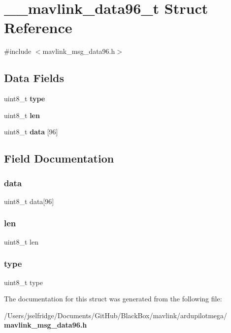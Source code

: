 \section{\+\_\+\+\_\+mavlink\+\_\+data96\+\_\+t Struct Reference}
\label{struct____mavlink__data96__t}


{\ttfamily \#include $<$mavlink\+\_\+msg\+\_\+data96.\+h$>$}

\subsection*{Data Fields}
\begin{DoxyCompactItemize}
\item 
uint8\+\_\+t \textbf{ type}
\item 
uint8\+\_\+t \textbf{ len}
\item 
uint8\+\_\+t \textbf{ data} [96]
\end{DoxyCompactItemize}


\subsection{Field Documentation}
\mbox{\label{struct____mavlink__data96__t_ac5e41067d4d5baa35dd4ac79c11266f3}} 
\subsubsection{data}
{\footnotesize\ttfamily uint8\+\_\+t data[96]}

\mbox{\label{struct____mavlink__data96__t_a5723e60ffd628510c699eddbce90be23}} 
\subsubsection{len}
{\footnotesize\ttfamily uint8\+\_\+t len}

\mbox{\label{struct____mavlink__data96__t_a1d127017fb298b889f4ba24752d08b8e}} 
\subsubsection{type}
{\footnotesize\ttfamily uint8\+\_\+t type}



The documentation for this struct was generated from the following file\+:\begin{DoxyCompactItemize}
\item 
/\+Users/jselfridge/\+Documents/\+Git\+Hub/\+Black\+Box/mavlink/ardupilotmega/\textbf{ mavlink\+\_\+msg\+\_\+data96.\+h}\end{DoxyCompactItemize}
